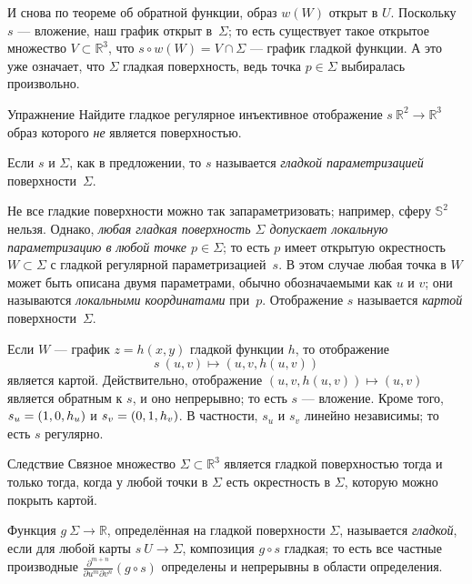 И снова по теореме об обратной функции, образ $w(W)$ открыт в $U$.
Поскольку $s$ --- вложение, наш график открыт в~$\Sigma$;
то есть существует такое открытое множество $V\subset \mathbb{R}^3$, что $s\circ w(W)=V\cap \Sigma$ --- график гладкой функции.
А это уже означает, что $\Sigma$ гладкая поверхность, ведь точка $p\in \Sigma$ выбиралась произвольно.
\qeds


\begin{thm}{Упражнение}\label{ex:9-surf}
Найдите гладкое регулярное инъективное отображение $s\:\mathbb{R}^2\to\mathbb{R}^3$ образ которого \textit{не} является поверхностью.
\end{thm}

Если $s$ и $\Sigma$, как в предложении, то $s$ называется \emph{гладкой параметризацией} поверхности~$\Sigma$. 

Не все гладкие поверхности можно так запараметризовать;
например, сферу $\mathbb{S}^2$ нельзя.
Однако, \textit{любая гладкая поверхность $\Sigma$ допускает локальную параметризацию в любой точке $p\in\Sigma$}; то есть $p$ имеет открытую окрестность $W\subset \Sigma$ с гладкой регулярной параметризацией~$s$.
В этом случае любая точка в $W$ может быть описана двумя параметрами, обычно обозначаемыми как $u$ и $v$;
они называются \emph{локальными координатами} при~$p$.
Отображение $s$ называется \emph{картой} поверхности~$\Sigma$.

Если $W$ --- график $z=h(x,y)$ гладкой функции $h$, то отображение 
\[s\:(u,v)\mapsto (u,v,h(u,v))\] является картой.
Действительно, отображение $(u,v,h(u,v))\mapsto (u,v)$ является обратным к $s$, и оно непрерывно;
то есть $s$ --- вложение.
Кроме того,
$s_u\z=(1,0,h_u)$ и $s_v\z=(0,1,h_v)$. 
В частности, $s_u$ и $s_v$ линейно независимы;
то есть $s$ регулярно.

\begin{thm}{Следствие}\label{cor:reg-parmeterization}
Связное множество $\Sigma\subset \mathbb{R}^3$ является гладкой поверхностью тогда и только тогда, когда у любой точки в $\Sigma$ есть 
окрестность в $\Sigma$, которую можно покрыть картой.
\end{thm}

Функция $g\: \Sigma \to \mathbb{R}$, определённая на гладкой поверхности $\Sigma$, называется \emph{гладкой}, если для любой карты $s \: U\to \Sigma$,
композиция $g\circ s$ гладкая; то есть все частные производные $\frac{\partial^{m+n}}{\partial u^m\partial v^n}(g\circ s)$ определены и непрерывны в области определения.



